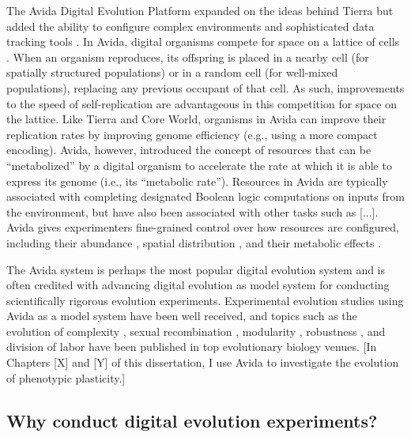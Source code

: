 The Avida Digital Evolution Platform expanded on the ideas behind Tierra but added the ability to configure complex environments and sophisticated data tracking tools  \citep{adami_evolutionary_1994,ofria_avida_2004,ofria_avida:_2009}.
In Avida, digital organisms compete for space on a lattice of cells \citep{ofria_avida:_2009}.
When an organism reproduces, its offspring is placed in a nearby cell (for spatially structured populations) or in a random cell (for well-mixed populations), replacing any previous occupant of that cell.
As such, improvements to the speed of self-replication are advantageous in this competition for space on the lattice.
Like Tierra and Core World, organisms in Avida can improve their replication rates by improving genome efficiency (e.g., using a more compact encoding).
Avida, however, introduced the concept of resources that can be ``metabolized'' by a digital organism to accelerate the rate at which it is able to express its genome (i.e., its ``metabolic rate'').
Resources in Avida are typically associated with completing designated Boolean logic computations on inputs from the environment, but have also been associated with other tasks such as [...].
Avida gives experimenters fine-grained control over how resources are configured, including their abundance \citep{cooper_evolution_2002}, spatial distribution \citep{dolson_spatial_2017}, and their metabolic effects \citep{canino-koning_evolution_2016,canino-koning_fluctuating_2019}.

The Avida system is perhaps the most popular digital evolution system and is often credited with advancing digital evolution as model system for conducting scientifically rigorous evolution experiments.
Experimental evolution studies using Avida as a model system have been well received, and topics such as the evolution of complexity \citep{adami_evolution_2000,lenski_evolutionary_2003}, sexual recombination \citep{misevic_experiments_2010}, modularity \citep{misevic_sexual_2006}, robustness \citep{lenski_genome_1999,elena_effects_2007}, and division of labor \citep{goldsby_task-switching_2012,goldsby_evolutionary_2014} have been published in top evolutionary biology venues.
[In Chapters [X] and [Y] of this dissertation, I use Avida to investigate the evolution of phenotypic plasticity.]

\subsection{Why conduct digital evolution experiments?}

